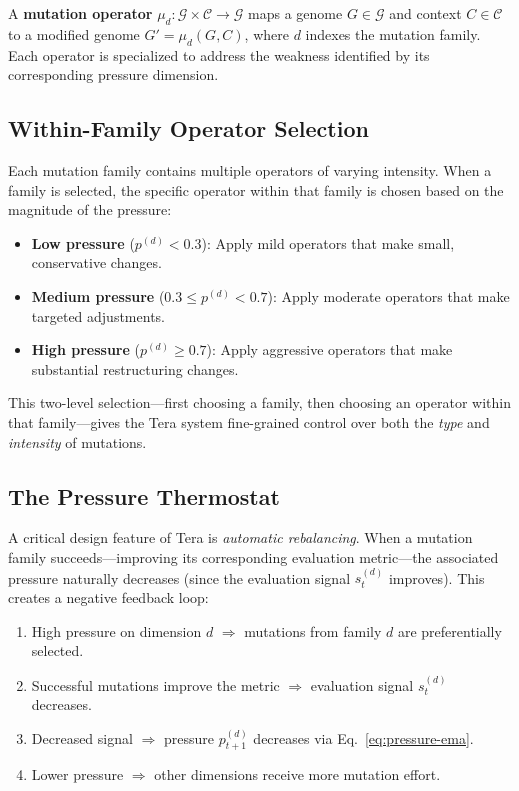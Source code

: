 \begin{definition}
A \textbf{mutation operator} $\mu_d : \mathcal{G} \times \mathcal{C} \to \mathcal{G}$ maps a genome $G \in \mathcal{G}$ and context $C \in \mathcal{C}$ to a modified genome $G' = \mu_d(G, C)$, where $d$ indexes the mutation family. Each operator is specialized to address the weakness identified by its corresponding pressure dimension.
\end{definition}

\subsection{Within-Family Operator Selection}

Each mutation family contains multiple operators of varying intensity. When a family is selected, the specific operator within that family is chosen based on the magnitude of the pressure:

\begin{itemize}[leftmargin=1.5em]
  \item \textbf{Low pressure} ($p^{(d)} < 0.3$): Apply mild operators that make small, conservative changes.
  \item \textbf{Medium pressure} ($0.3 \leq p^{(d)} < 0.7$): Apply moderate operators that make targeted adjustments.
  \item \textbf{High pressure} ($p^{(d)} \geq 0.7$): Apply aggressive operators that make substantial restructuring changes.
\end{itemize}

This two-level selection---first choosing a family, then choosing an operator within that family---gives the Tera system fine-grained control over both the \emph{type} and \emph{intensity} of mutations.

\subsection{The Pressure Thermostat}
\label{subsec:thermostat}

A critical design feature of Tera is \emph{automatic rebalancing}. When a mutation family succeeds---improving its corresponding evaluation metric---the associated pressure naturally decreases (since the evaluation signal $s_t^{(d)}$ improves). This creates a negative feedback loop:

\begin{enumerate}[leftmargin=1.8em]
  \item High pressure on dimension $d$ $\Rightarrow$ mutations from family $d$ are preferentially selected.
  \item Successful mutations improve the metric $\Rightarrow$ evaluation signal $s_t^{(d)}$ decreases.
  \item Decreased signal $\Rightarrow$ pressure $p_{t+1}^{(d)}$ decreases via Eq.~\eqref{eq:pressure-ema}.
  \item Lower pressure $\Rightarrow$ other dimensions receive more mutation effort.
\end{enumerate}


